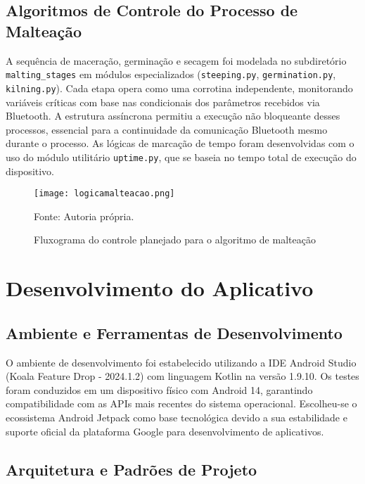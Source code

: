 \subsection{Algoritmos de Controle do Processo de Malteação}
A sequência de maceração, germinação e secagem foi modelada no subdiretório \texttt{malting\_stages} em módulos especializados (\texttt{steeping.py}, \texttt{germination.py}, \texttt{kilning.py}). Cada etapa opera como uma corrotina independente, monitorando variáveis críticas com base nas condicionais dos parâmetros recebidos via Bluetooth. A estrutura assíncrona permitiu a execução não bloqueante desses processos, essencial para a continuidade da comunicação Bluetooth mesmo durante o processo. As lógicas de marcação de tempo foram desenvolvidas com o uso do módulo utilitário \texttt{uptime.py}, que se baseia no tempo total de execução do dispositivo.

\begin{figure}[ht]
    \centering
    \caption{Fluxograma do controle planejado para o algoritmo de malteação}
    \label{fig:logicamalteacao}
    \texttt{[image: logicamalteacao.png]}

    {\centering\footnotesize Fonte: Autoria própria.\par}
\end{figure}

  
\section{Desenvolvimento do Aplicativo}
\subsection{Ambiente e Ferramentas de Desenvolvimento}

O ambiente de desenvolvimento foi estabelecido utilizando a IDE Android Studio (Koala Feature Drop - 2024.1.2) com linguagem Kotlin na versão 1.9.10. Os testes foram conduzidos em um dispositivo físico com Android 14, garantindo compatibilidade com as APIs mais recentes do sistema operacional. Escolheu-se o ecossistema Android Jetpack como base tecnológica devido a sua estabilidade e suporte oficial da plataforma Google para desenvolvimento de aplicativos.

\subsection{Arquitetura e Padrões de Projeto}

